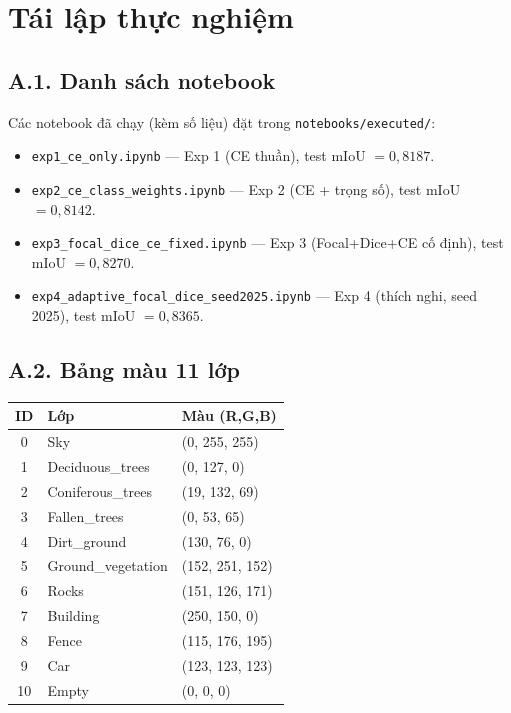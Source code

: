\chapter{Tái lập thực nghiệm}
\label{ap:reproduce}

\section*{A.1. Danh sách notebook}
Các notebook đã chạy (kèm số liệu) đặt trong \texttt{notebooks/executed/}:
\begin{itemize}[leftmargin=1.4cm]
  \item \texttt{exp1\_ce\_only.ipynb} --- Exp 1 (CE thuần), test mIoU $= 0{,}8187$.
  \item \texttt{exp2\_ce\_class\_weights.ipynb} --- Exp 2 (CE + trọng số),
  test mIoU $= 0{,}8142$.
  \item \texttt{exp3\_focal\_dice\_ce\_fixed.ipynb} --- Exp 3 (Focal+Dice+CE cố
  định), test mIoU $= 0{,}8270$.
  \item \texttt{exp4\_adaptive\_focal\_dice\_seed2025.ipynb} --- Exp 4 (thích nghi,
  seed 2025), test mIoU $= 0{,}8365$.
\end{itemize}

\section*{A.2. Bảng màu 11 lớp}
\begin{center}
\small
\begin{tabular}{c l l}
\toprule
\textbf{ID} & \textbf{Lớp} & \textbf{Màu (R,G,B)} \\
\midrule
0  & Sky               & (0, 255, 255) \\
1  & Deciduous\_trees  & (0, 127, 0) \\
2  & Coniferous\_trees & (19, 132, 69) \\
3  & Fallen\_trees     & (0, 53, 65) \\
4  & Dirt\_ground      & (130, 76, 0) \\
5  & Ground\_vegetation& (152, 251, 152) \\
6  & Rocks             & (151, 126, 171) \\
7  & Building          & (250, 150, 0) \\
8  & Fence             & (115, 176, 195) \\
9  & Car               & (123, 123, 123) \\
10 & Empty             & (0, 0, 0) \\
\bottomrule
\end{tabular}
\end{center}

